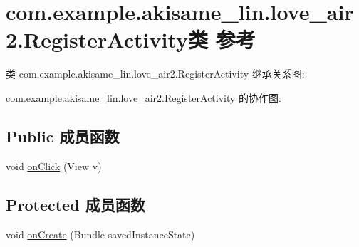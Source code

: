\hypertarget{classcom_1_1example_1_1akisame__lin_1_1love__air2_1_1_register_activity}{}\section{com.\+example.\+akisame\+\_\+lin.\+love\+\_\+air2.\+Register\+Activity类 参考}
\label{classcom_1_1example_1_1akisame__lin_1_1love__air2_1_1_register_activity}


类 com.\+example.\+akisame\+\_\+lin.\+love\+\_\+air2.\+Register\+Activity 继承关系图\+:


com.\+example.\+akisame\+\_\+lin.\+love\+\_\+air2.\+Register\+Activity 的协作图\+:
\subsection*{Public 成员函数}
\begin{DoxyCompactItemize}
\item 
void \mbox{\hyperlink{classcom_1_1example_1_1akisame__lin_1_1love__air2_1_1_register_activity_afa17df114e49aa3f9574fe96063e66ba}{on\+Click}} (View v)
\end{DoxyCompactItemize}
\subsection*{Protected 成员函数}
\begin{DoxyCompactItemize}
\item 
void \mbox{\hyperlink{classcom_1_1example_1_1akisame__lin_1_1love__air2_1_1_register_activity_ac9a58b42431a4377ce41dc4fd59be5b8}{on\+Create}} (Bundle saved\+Instance\+State)
\end{DoxyCompactItemize}
